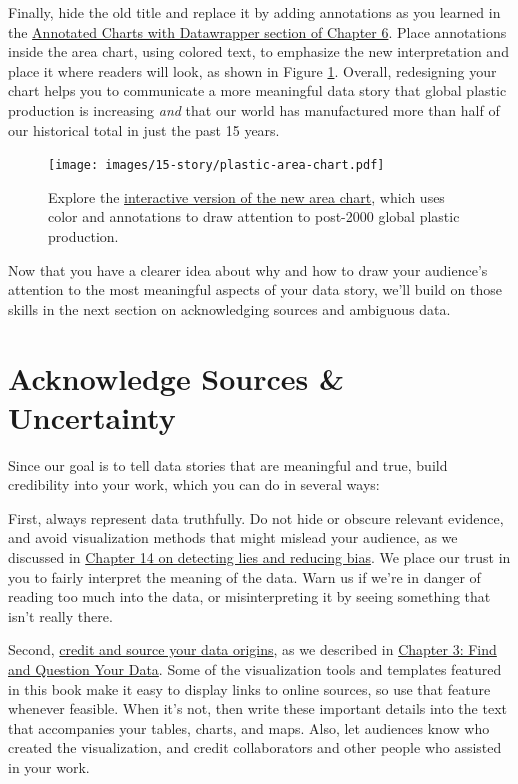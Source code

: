 \documentclass[
  english,
]{book}
\begin{document}
Finally, hide the old title and replace it by adding annotations as you learned in the \href{annotated-datawrapper.html}{Annotated Charts with Datawrapper section of Chapter 6}. Place annotations inside the area chart, using colored text, to emphasize the new interpretation and place it where readers will look, as shown in Figure \ref{fig:plastic-area-chart}. Overall, redesigning your chart helps you to communicate a more meaningful data story that global plastic production is increasing \emph{and} that our world has manufactured more than half of our historical total in just the past 15 years.



\begin{figure}
\centering
\texttt{[image: images/15-story/plastic-area-chart.pdf]}
\caption{\label{fig:plastic-area-chart}Explore the \href{https://datawrapper.dwcdn.net/1TyyZ/}{interactive version of the new area chart}, which uses color and annotations to draw attention to post-2000 global plastic production.}
\end{figure}

Now that you have a clearer idea about why and how to draw your audience's attention to the most meaningful aspects of your data story, we'll build on those skills in the next section on acknowledging sources and ambiguous data.

\hypertarget{sources-uncertainty}{%
\section*{Acknowledge Sources \& Uncertainty}\label{sources-uncertainty}}

Since our goal is to tell data stories that are meaningful and true, build credibility into your work, which you can do in several ways:

First, always represent data truthfully. Do not hide or obscure relevant evidence, and avoid visualization methods that might mislead your audience, as we discussed in \href{detect.html}{Chapter 14 on detecting lies and reducing bias}. We place our trust in you to fairly interpret the meaning of the data. Warn us if we're in danger of reading too much into the data, or misinterpreting it by seeing something that isn't really there.

Second, \href{source.html}{credit and source your data origins}, as we described in \href{find.html}{Chapter 3: Find and Question Your Data}. Some of the visualization tools and templates featured in this book make it easy to display links to online sources, so use that feature whenever feasible. When it's not, then write these important details into the text that accompanies your tables, charts, and maps. Also, let audiences know who created the visualization, and credit collaborators and other people who assisted in your work.
\end{document}
